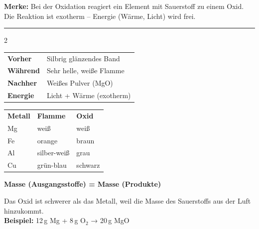 \documentclass[9pt, a4paper]{article}
\newcommand{\abschnitt}[1]{%
    \vspace{6pt}%
    \noindent{\normalsize\bfseries\textcolor{fachfarbe}{#1}}%
    \vspace{2pt}%
    \nopagebreak[4]%
}
\begin{document}
\begin{merkkasten}
\textbf{Merke:} Bei der Oxidation reagiert ein Element mit Sauerstoff zu einem Oxid. Die Reaktion ist exotherm – Energie (Wärme, Licht) wird frei.
\end{merkkasten}

\vspace{-2pt}
\hrule
\vspace{4pt}


\begin{multicols}{2}

\abschnitt{Beobachtungen (Mg-Verbrennung)}

\small
\begin{tabular}{@{}p{1.8cm}p{5cm}@{}}
\textbf{Vorher} & Silbrig glänzendes Band \\
\textbf{Während} & Sehr helle, weiße Flamme \\
\textbf{Nachher} & Weißes Pulver (MgO) \\
\textbf{Energie} & Licht + Wärme (exotherm)
\end{tabular}

\columnbreak

\abschnitt{Flammenfarben der Metalle}

\small
\begin{tabular}{@{}lll@{}}
\textbf{Metall} & \textbf{Flamme} & \textbf{Oxid} \\
Mg & weiß & weiß \\
Fe & orange & braun \\
Al & silber-weiß & grau \\
Cu & grün-blau & schwarz
\end{tabular}

\end{multicols}

\abschnitt{Massenerhaltung}

\begin{formelkasten}
\centering
\textbf{Masse (Ausgangsstoffe) = Masse (Produkte)}
\end{formelkasten}

Das Oxid ist schwerer als das Metall, weil die Masse des Sauerstoffs aus der Luft hinzukommt.\\
\textbf{Beispiel:} 12\,g Mg + 8\,g O$_2$ → 20\,g MgO

\end{document}
